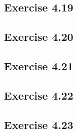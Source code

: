 \documentclass[../A&M.tex]{subfiles}
\begin{document}
\subsection*{Exercise 4.19}

\subsection*{Exercise 4.20}

\subsection*{Exercise 4.21}

\subsection*{Exercise 4.22}

\subsection*{Exercise 4.23}
\phantom{}
\end{document}

